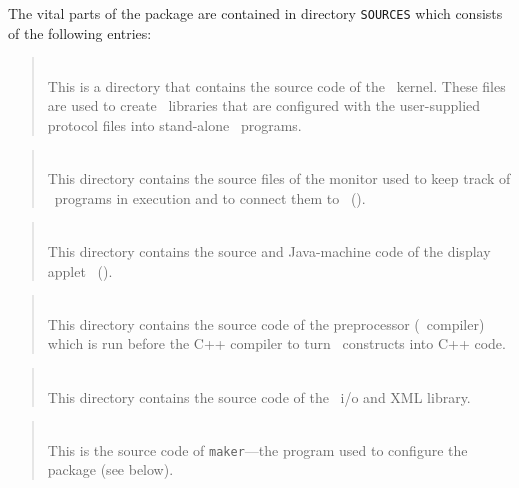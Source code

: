 The vital parts of the package are contained in directory {\tt SOURCES}
which consists of the following entries:

\medskip

\begin{quote}
\noindent{}\\ \hspace{0in}
This is a directory that contains the source code of the \smurph\ kernel.
These files are used to create \smurph\ libraries that are configured with
the user-supplied protocol files into stand-alone \smurph\ programs.
\end{quote}

\begin{quote}
\noindent{}\\ \hspace{0in}
This directory contains the source files of the monitor used to keep track
of \smurph\ programs in execution
and to connect them to \dsd\ ().
\end{quote}

\begin{quote}
\noindent{}\\ \hspace{0in}
This directory contains the source and Java-machine
code of the display applet \dsd\ ().
\end{quote}

\begin{quote}
\noindent{}\\ \hspace{0in}
This directory contains the source code of the preprocessor 
(\smurph\ compiler) which is run before the C++ compiler
to turn \smurph\ constructs into C++ code.
\end{quote}

\begin{quote}
\noindent{}\\ \hspace{0in}
This directory contains the source code of the \smurph\ 
i/o and XML library.
\end{quote}

\begin{quote}
\noindent{}\\ \hspace{0in}
This is the source code of {\tt maker}---the
program used to configure the package (see below).
\end{quote}

